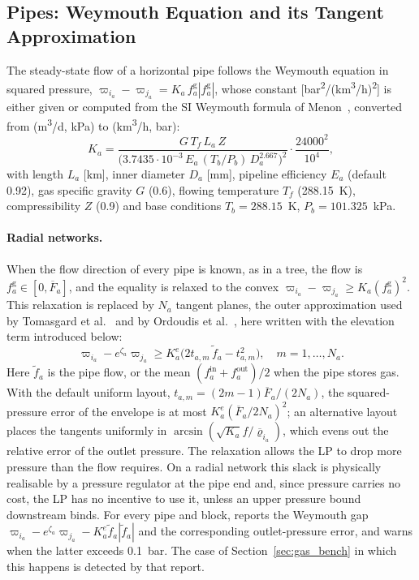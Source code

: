\subsection{Pipes: Weymouth Equation and its Tangent Approximation}

The steady-state flow of a horizontal pipe follows the Weymouth
equation in squared pressure,
$\varpi_{i_a} - \varpi_{j_a} = K_a\, f^{\mathrm{g}}_a |f^{\mathrm{g}}_a|$,
whose constant [bar\textsuperscript{2}/(km\textsuperscript{3}/h)\textsuperscript{2}]
is either given or computed from the SI Weymouth formula of
Menon~\cite[eq.~(2.62)]{menon2005gas}, converted from
(m\textsuperscript{3}/d, kPa) to (km\textsuperscript{3}/h, bar):
\begin{equation}
\label{eq:gas_weymouth_k}
K_a = \frac{G\, T_f\, L_a\, Z}
  {\bigl(3.7435\cdot 10^{-3}\, E_a\, (T_b/P_b)\, D_a^{2.667}\bigr)^2}
  \cdot \frac{24000^2}{10^4},
\end{equation}
with length $L_a$ [km], inner diameter $D_a$ [mm], pipeline efficiency
$E_a$ (default 0.92), gas specific gravity $G$ (0.6), flowing
temperature $T_f$ (288.15~K), compressibility $Z$ (0.9) and base
conditions $T_b = 288.15$~K, $P_b = 101.325$~kPa.

\paragraph{Radial networks.}
When the flow direction of every pipe is known, as in a tree, the flow
is $f^{\mathrm{g}}_a \in [0, \overline{F}_a]$, and the equality is
relaxed to the convex $\varpi_{i_a} - \varpi_{j_a} \geq K_a (f^{\mathrm{g}}_a)^2$.
This relaxation is replaced by $N_a$ tangent planes, the outer
approximation used by Tomasgard et al.~\cite{tomasgard2007gas} and by
Ordoudis et al.~\cite{ordoudis2019gas}, here written with the elevation
term introduced below:
\begin{equation}
\label{eq:gas_weymouth}
\varpi_{i_a} - e^{\zeta_a}\varpi_{j_a}
  \geq K^e_a \bigl(2 t_{a,m}\, \tilde f_a - t_{a,m}^2\bigr),
  \quad m = 1,\dots,N_a .
\end{equation}
Here $\tilde f_a$ is the pipe flow, or the mean
$(f^{\mathrm{in}}_a + f^{\mathrm{out}}_a)/2$ when the pipe stores gas.
With the default uniform layout, $t_{a,m} = (2m-1)\overline{F}_a/(2N_a)$,
the squared-pressure error of the envelope is at most
$K^e_a(\overline{F}_a/2N_a)^2$; an alternative layout places the
tangents uniformly in $\arcsin(\sqrt{K_a} f / \overline{\varrho}_{i_a})$,
which evens out the relative error of the outlet pressure.  The
relaxation allows the LP to drop more pressure than the flow requires.
On a radial network this slack is physically realisable by a pressure
regulator at the pipe end and, since pressure carries no cost, the LP
has no incentive to use it, unless an upper pressure bound downstream
binds.  For every pipe and block, \gtopt{} reports the Weymouth gap
$\varpi_{i_a} - e^{\zeta_a}\varpi_{j_a} - K^e_a \tilde f_a|\tilde f_a|$
and the corresponding outlet-pressure error, and warns when the latter
exceeds 0.1~bar.  The case of Section~\ref{sec:gas_bench} in which this
happens is detected by that report.

